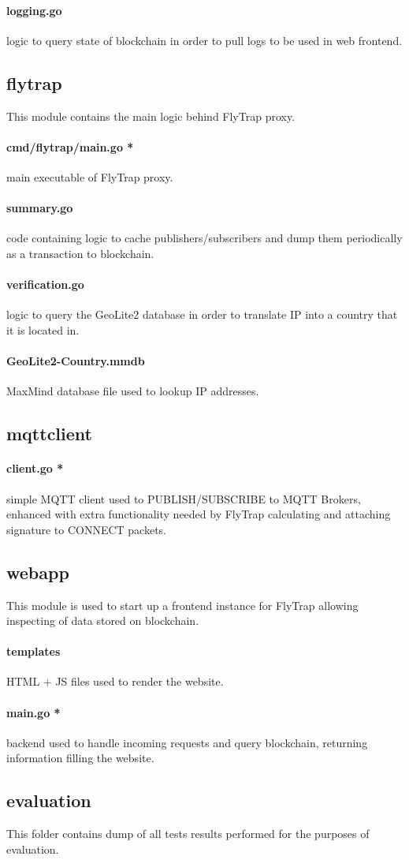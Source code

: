 \paragraph{logging.go} logic to query state of blockchain in order to pull logs to be used in web frontend.
\subsection{flytrap}
This module contains the main logic behind FlyTrap proxy. 
\paragraph{cmd/flytrap/main.go *} main executable of FlyTrap proxy.
\paragraph{summary.go} code containing logic to cache publishers/subscribers and dump them periodically as a transaction to blockchain.
\paragraph{verification.go} logic to query the GeoLite2 database in order to translate IP into a country that it is located in.
\paragraph{GeoLite2-Country.mmdb} MaxMind database file used to lookup IP addresses.
\subsection{mqttclient}
\paragraph{client.go *} simple MQTT client used to PUBLISH/SUBSCRIBE to MQTT Brokers, enhanced with extra functionality needed by FlyTrap calculating and attaching signature to CONNECT packets.
\subsection{webapp}
This module is used to start up a frontend instance for FlyTrap allowing inspecting of data stored on blockchain.
\paragraph{templates} HTML + JS files used to render the website.
\paragraph{main.go *} backend used to handle incoming requests and query blockchain, returning information filling the website.
\subsection{evaluation}
This folder contains dump of all tests results performed for the purposes of evaluation.
